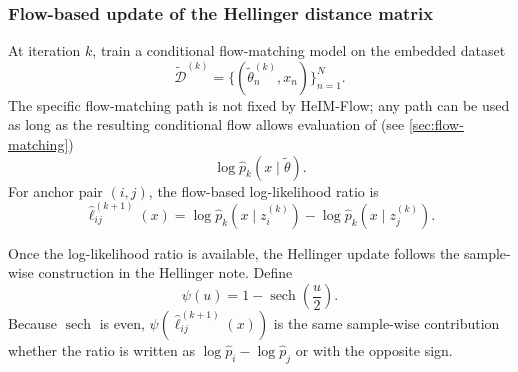 \subsubsection{Flow-based update of the Hellinger distance matrix}

At iteration $k$, train a conditional flow-matching model on the embedded dataset
\begin{equation}
    \widetilde{\mathcal D}^{(k)}
    =
    \{(\tilde{\theta}_n^{(k)},x_n)\}_{n=1}^N.
\end{equation}
The specific flow-matching path is not fixed by HeIM-Flow; any path can be used as long as the resulting conditional flow allows evaluation of (see \ref{sec:flow-matching})
\begin{equation}
    \log \widehat p_k(x\mid \tilde{\theta}).
\end{equation}
For anchor pair $(i,j)$, the flow-based log-likelihood ratio is
\begin{equation}
\label{eq:flow-llr}
    \widehat{\ell}_{ij}^{(k+1)}(x)
    =
    \log \widehat p_k(x\mid z_i^{(k)})
    -
    \log \widehat p_k(x\mid z_j^{(k)}).
\end{equation}

Once the log-likelihood ratio is available, the Hellinger update follows the sample-wise construction in the Hellinger note. Define
\begin{equation}
    \psi(u)
    =
    1-\operatorname{sech}\!\left(\frac{u}{2}\right).
\end{equation}
Because $\operatorname{sech}$ is even, $\psi(\widehat{\ell}_{ij}^{(k+1)}(x))$ is the same sample-wise contribution whether the ratio is written as $\log \widehat p_i-\log \widehat p_j$ or with the opposite sign.

